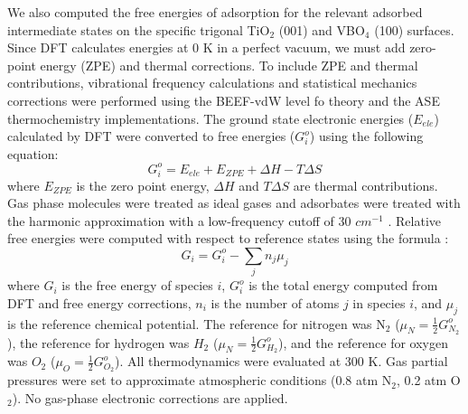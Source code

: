We also computed the free energies of adsorption for the relevant adsorbed intermediate states on the specific trigonal TiO$_2$ (001) and VBO$_4$ (100) surfaces. Since DFT calculates energies at 0 K in a perfect vacuum, we must add zero-point energy (ZPE) and thermal corrections. To include ZPE and thermal contributions, vibrational frequency calculations and statistical mechanics corrections were performed using the BEEF-vdW level fo theory and the ASE thermochemistry implementations. The ground state electronic energies ($E_{ele}$) calculated by DFT were converted to free energies ($G_i^o$) using the following equation:
\begin{equation}
G_i^o =E_{ele} + E_{ZPE} + \Delta H - T \Delta S
\end{equation}
where $E_{ZPE}$ is the zero point energy, $\Delta H $ and $T \Delta S$ are thermal contributions. Gas phase molecules were treated as ideal gases and adsorbates were treated with the harmonic approximation with a low-frequency cutoff of 30 $cm^{-1}$ \cite{BROGAARD_2014}.
Relative free energies were computed with respect to reference states using the formula \cite{Reuter_2005}:
\begin{equation}
G_i = G_i^o - \sum_j n_j \mu_j
\end{equation} 
where  $G_i$ is the free energy of species $i$, $G_i^o $ is the total energy computed from DFT and free energy corrections, $n_i$ is the number of atoms $j$ in species $i$, and $\mu_j$ is the reference chemical potential. The reference for nitrogen was N$_2$ ($\mu_N = \frac{1}{2}G_{N_2}^o$), the reference for hydrogen was $H_2$ ($\mu_N = \frac{1}{2}G_{H_2}^o$), and the reference for oxygen was $O_2$ ($\mu_O = \frac{1}{2}G_{O_2}^o$). All thermodynamics were evaluated at 300 K. Gas partial pressures were set to approximate atmospheric conditions (0.8 atm N$_2$, 0.2 atm O$_2$). No gas-phase electronic corrections are applied.

